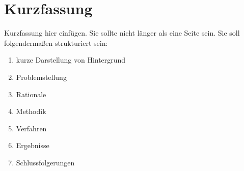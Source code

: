 \chapter*{Kurzfassung}

Kurzfassung hier einfügen. Sie sollte nicht länger als eine Seite sein. Sie soll folgendermaßen strukturiert sein:

\begin{enumerate}
    \item kurze Darstellung von Hintergrund
    \item Problemstellung
    \item Rationale
    \item Methodik
    \item Verfahren
    \item Ergebnisse
    \item Schlussfolgerungen
\end{enumerate}